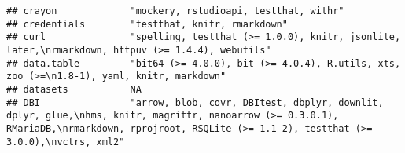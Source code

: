 \documentclass[
]{article}
\begin{document}
\begin{verbatim}
## crayon             "mockery, rstudioapi, testthat, withr"                                                                                                                                                                                                                                                                                                                                                                                                                                            
## credentials        "testthat, knitr, rmarkdown"                                                                                                                                                                                                                                                                                                                                                                                                                                                      
## curl               "spelling, testthat (>= 1.0.0), knitr, jsonlite, later,\nrmarkdown, httpuv (>= 1.4.4), webutils"                                                                                                                                                                                                                                                                                                                                                                                  
## data.table         "bit64 (>= 4.0.0), bit (>= 4.0.4), R.utils, xts, zoo (>=\n1.8-1), yaml, knitr, markdown"                                                                                                                                                                                                                                                                                                                                                                                          
## datasets           NA                                                                                                                                                                                                                                                                                                                                                                                                                                                                                
## DBI                "arrow, blob, covr, DBItest, dbplyr, downlit, dplyr, glue,\nhms, knitr, magrittr, nanoarrow (>= 0.3.0.1), RMariaDB,\nrmarkdown, rprojroot, RSQLite (>= 1.1-2), testthat (>= 3.0.0),\nvctrs, xml2"                                                                                                                                                                                                                                                                                 

\end{verbatim}
\end{document}
